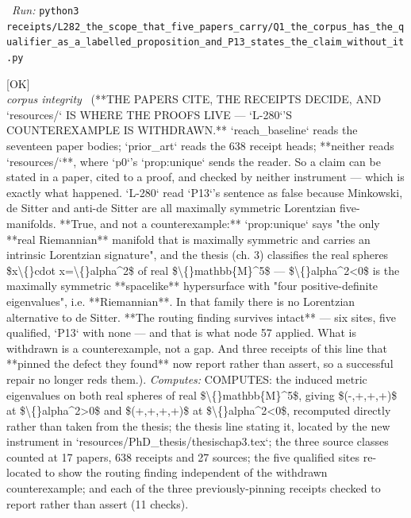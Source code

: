 \begin{description}
\ \emph{Run:} \texttt{python3 receipts/L282\_the\_scope\_that\_five\_papers\_carry/Q1\_the\_corpus\_has\_the\_qualifier\_as\_a\_labelled\_proposition\_and\_P13\_states\_the\_claim\_without\_it.py}
\item[\label{rcpt:T1_the_papers_cite_the_receipts_decide_and_resources_is_where_the_proofs_live}\texttt{T1\_the\_papers\_cite\_the\_receipts\_decide\_and\_resources\_is\_where\_the\_proofs\_live}]\hfill\textsf{[OK]}\\
\textit{corpus integrity} \ (**THE PAPERS CITE, THE RECEIPTS DECIDE, AND `resources/` IS WHERE THE PROOFS LIVE --- `L-280`'S COUNTEREXAMPLE IS WITHDRAWN.** `reach\_baseline` reads the seventeen paper bodies; `prior\_art` reads the 638 receipt heads; **neither reads `resources/`**, where `p0`'s `prop:unique` sends the reader. So a claim can be stated in a paper, cited to a proof, and checked by neither instrument --- which is exactly what happened. `L-280` read `P13`'s sentence as false because Minkowski, de Sitter and anti-de Sitter are all maximally symmetric Lorentzian five-manifolds. **True, and not a counterexample:** `prop:unique` says "the only **real Riemannian** manifold that is maximally symmetric and carries an intrinsic Lorentzian signature", and the thesis (ch. 3) classifies the real spheres \$x\textbackslash\{\}cdot x=\textbackslash\{\}alpha\textasciicircum{}2\$ of real \$\textbackslash\{\}mathbb\{M\}\textasciicircum{}5\$ --- \$\textbackslash\{\}alpha\textasciicircum{}2<0\$ is the maximally symmetric **spacelike** hypersurface with "four positive-definite eigenvalues", i.e. **Riemannian**. In that family there is no Lorentzian alternative to de Sitter. **The routing finding survives intact** --- six sites, five qualified, `P13` with none --- and that is what node 57 applied. What is withdrawn is a counterexample, not a gap. And three receipts of this line that **pinned the defect they found** now report rather than assert, so a successful repair no longer reds them.). 
\emph{Computes:} COMPUTES: the induced metric eigenvalues on both real spheres of real \$\textbackslash\{\}mathbb\{M\}\textasciicircum{}5\$, giving \$(-,+,+,+)\$ at \$\textbackslash\{\}alpha\textasciicircum{}2>0\$ and \$(+,+,+,+)\$ at \$\textbackslash\{\}alpha\textasciicircum{}2<0\$, recomputed directly rather than taken from the thesis; the thesis line stating it, located by the new instrument in `resources/PhD\_thesis/thesischap3.tex`; the three source classes counted at 17 papers, 638 receipts and 27 sources; the five qualified sites re-located to show the routing finding independent of the withdrawn counterexample; and each of the three previously-pinning receipts checked to report rather than assert (11 checks).

\end{description}
